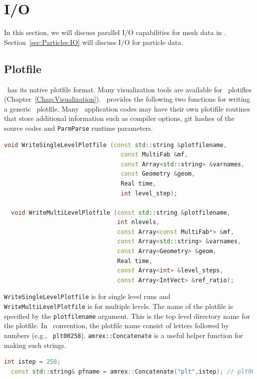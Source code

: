 {{\section{I/O}

In this section, we will discuss parallel I/O capabilities for mesh
data in \amrex.  Section~\ref{sec:Particles:IO} will discuss I/O for
particle data.

\subsection{Plotfile}

\amrex\ has its native plotfile format.  Many visualization tools are
available for \amrex\ plotifles
(Chapter~\ref{Chap:Visualization}).  \amrex\ provides the following
two functions for writing a generic \amrex\ plotfile.  Many \amrex\
application codes may have their own plotifile routines that store
additional information such as compiler options, git hashes of the
source codes and {\tt ParmParse} runtime parameters.
\begin{lstlisting}[language=cpp]
  void WriteSingleLevelPlotfile (const std::string &plotfilename,
                                 const MultiFab &mf,
                                 const Array<std::string> &varnames,
                                 const Geometry &geom,
                                 Real time,
                                 int level_step);

  void WriteMultiLevelPlotfile (const std::string &plotfilename,
                                int nlevels,
                                const Array<const MultiFab*> &mf,
                                const Array<std::string> &varnames,
                                const Array<Geometry> &geom,
                                Real time,
                                const Array<int> &level_steps,
                                const Array<IntVect> &ref_ratio);
\end{lstlisting}
{\tt WriteSingleLevelPlotfile} is for single level runs and {\tt
WriteMultiLevelPlotfile} is for multiple levels.  The name of the
plotfile is specified by the {\tt plotfilename} argument.  This is the
top level directory name for the plotfile.  In \amrex\ convention, the
plotfile name consist of letters followed by numbers (e.g., {\tt
plt00258}).  {\tt amrex::Concatenate} is a useful helper function for
making such strings.
\begin{lstlisting}[language=cpp]
  int istep = 258;
  const std::string& pfname = amrex::Concatenate("plt",istep); // plt00258


\end{lstlisting}}}
